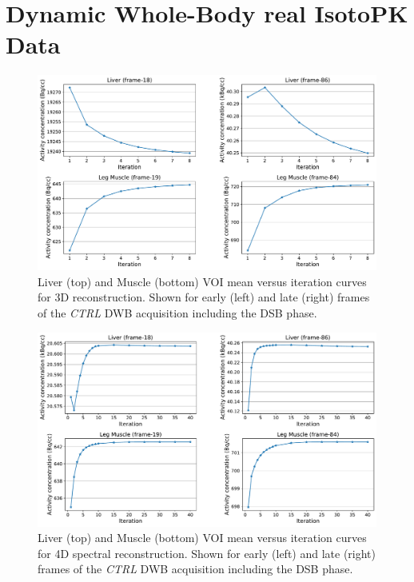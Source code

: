 \chapter{Dynamic Whole-Body real IsotoPK Data}

\begin{figure} [h!]
\centering
\includegraphics[scale=0.5,angle=0]{3_Results/3_3_DWB_Reconstruction/figures/3_3_IsotoPK_CTRL_DWB_3D_Convergence.pdf}
\caption{Liver (top) and Muscle (bottom) VOI mean versus iteration curves for 3D reconstruction. Shown for early (left) and late (right) frames of the \textit{CTRL} DWB acquisition including the DSB phase.}
\label{fig_3_3:IsotoPK_CTRL_DWB_4D_Convergence}
\end{figure} 

\begin{figure} [h!]
\centering
\includegraphics[scale=0.5,angle=0]{3_Results/3_3_DWB_Reconstruction/figures/3_3_IsotoPK_CTRL_DWB_4D_Convergence.pdf}
\caption{Liver (top) and Muscle (bottom) VOI mean versus iteration curves for 4D spectral reconstruction. Shown for early (left) and late (right) frames of the \textit{CTRL} DWB acquisition including the DSB phase.}
\label{fig_3_3:IsotoPK_CTRL_DSB_3D_Convergence}
\end{figure} 

